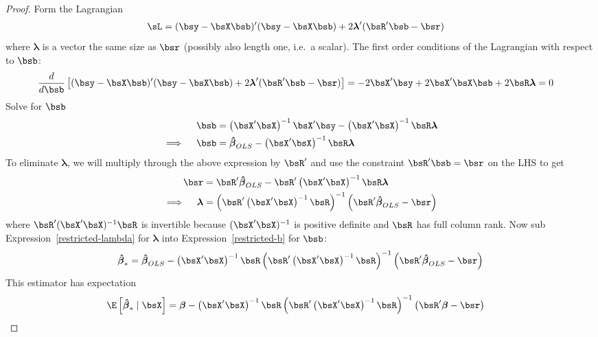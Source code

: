 \documentclass[12pt]{article}
\theoremstyle{plain}
\theoremstyle{definition}
\theoremstyle{remark}
\newcommand{\bsbeta}{\boldsymbol{\beta}}
\newcommand{\bslambda}{\boldsymbol{\lambda}}
\newcommand{\bshatbeta}{\boldsymbol{\hat{\beta}}}
\begin{document}
\begin{proof}
Form the Lagrangian
\begin{align*}
  \sL
  &=
  (\bsy-\bsX\bsb)'(\bsy-\bsX\bsb)
  + 2\bslambda' (\bsR'\bsb - \bsr)
\end{align*}
where $\bslambda$ is a vector the same size as $\bsr$ (possibly also length
one, i.e.\ a scalar).
The first order conditions of the Lagrangian with respect to $\bsb$:
\begin{align*}
  \frac{d}{d\bsb}
  \left[
    (\bsy-\bsX\bsb)'(\bsy-\bsX\bsb)
    + 2\bslambda' (\bsR'\bsb - \bsr)
  \right]
  &= -2\bsX'\bsy +2\bsX'\bsX\bsb + 2\bsR\bslambda
  =0
\end{align*}
Solve for $\bsb$
\begin{align}
  \bsb &=
  \left(\bsX'\bsX\right)^{-1} \bsX'\bsy
  - \left(\bsX'\bsX\right)^{-1} \bsR\bslambda
  \notag\\
  \implies\quad
  \bsb &=
  \bshatbeta_{OLS} - \left(\bsX'\bsX\right)^{-1}  \bsR\bslambda
  \label{restricted-b}
\end{align}
To eliminate $\bslambda$, we will multiply through the above expression
by $\bsR'$ and use the constraint $\bsR'\bsb=\bsr$ on the LHS to get
\begin{align}
  \bsr
  &=
  \bsR'\bshatbeta_{OLS}
  - \bsR'\left(\bsX'\bsX\right)^{-1} \bsR\bslambda \notag\\
  \implies\quad
  \bslambda
  &=
  \left(\bsR'\left(\bsX'\bsX\right)^{-1}  \bsR\right)^{-1}
  \left(\bsR'\bshatbeta_{OLS} -  \bsr\right)
  \label{restricted-lambda}
\end{align}
where $\bsR'(\bsX'\bsX)^{-1}\bsR$ is invertible because
$(\bsX'\bsX)^{-1}$ is positive definite and $\bsR$ has full column rank.
Now sub Expression~\ref{restricted-lambda} for $\bslambda$ into
Expression~\ref{restricted-b} for $\bsb$:
\begin{align*}
  \bshatbeta_*
  =
  \bshatbeta_{OLS} - \left(\bsX'\bsX\right)^{-1}  \bsR
  \left(\bsR'\left(\bsX'\bsX\right)^{-1}  \bsR\right)^{-1}
  \left(\bsR'\bshatbeta_{OLS} -  \bsr\right)
\end{align*}
This estimator has expectation
\begin{align*}
  \E\left[ \bshatbeta_* \;|\; \bsX \right]
  &=
  \bsbeta
  -
  \left(\bsX'\bsX\right)^{-1}  \bsR
  \left(\bsR'\left(\bsX'\bsX\right)^{-1}  \bsR\right)^{-1}
  \left( \bsR' \bsbeta -  \bsr\right)
\end{align*}

\end{proof}
\end{document}
